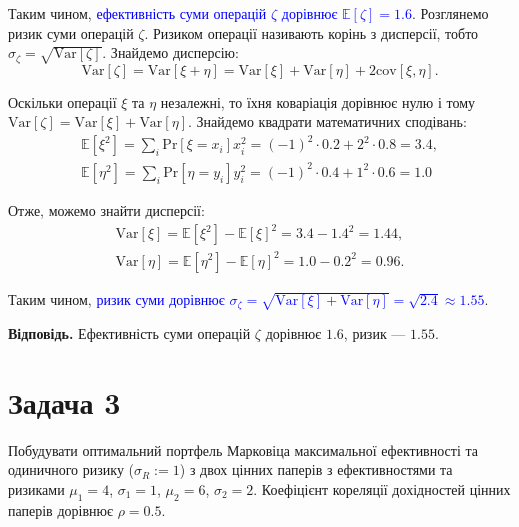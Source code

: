 \documentclass{test_template}
\begin{document}
Таким чином, \textcolor{blue}{ефективність суми операцій $\zeta$ дорівнює
$\mathbb{E}[\zeta] = 1.6$}. Розглянемо ризик суми операцій $\zeta$. Ризиком
операції називають корінь з дисперсії, тобто $\sigma_\zeta =
\sqrt{\text{Var}[\zeta]}$. Знайдемо дисперсію:
\begin{equation*}
    \text{Var}[\zeta] = \text{Var}[\xi + \eta] = \text{Var}[\xi] + \text{Var}[\eta] + 2\text{cov}[\xi,\eta].
\end{equation*}

Оскільки операції $\xi$ та $\eta$ незалежні, то їхня коваріація дорівнює нулю і
тому $\text{Var}[\zeta] = \text{Var}[\xi] + \text{Var}[\eta]$. Знайдемо квадрати 
математичних сподівань:
\begin{gather*}
    \mathbb{E}[\xi^2] = \sum_i \text{Pr}[\xi=x_i]x_i^2 = (-1)^2 \cdot 0.2 + 2^2 \cdot 0.8 = 3.4, \\
    \mathbb{E}[\eta^2] = \sum_i \text{Pr}[\eta=y_i]y_i^2 = (-1)^2 \cdot 0.4 + 1^2 \cdot 0.6 = 1.0
\end{gather*}

Отже, можемо знайти дисперсії:
\begin{gather*}
    \text{Var}[\xi] = \mathbb{E}[\xi^2] - \mathbb{E}[\xi]^2 = 3.4 - 1.4^2 = 1.44, \\
    \text{Var}[\eta] = \mathbb{E}[\eta^2] - \mathbb{E}[\eta]^2 = 1.0 - 0.2^2 = 0.96.
\end{gather*}

Таким чином, \textcolor{blue}{ризик суми дорівнює $\sigma_{\zeta} =
\sqrt{\text{Var}[\xi] + \text{Var}[\eta]} = \sqrt{2.4} \approx 1.55$}.

\textbf{Відповідь.} Ефективність суми операцій $\zeta$ дорівнює $1.6$, ризик ---
$1.55$.

\newpage

\section{Задача 3}

\begin{problem}
    Побудувати оптимальний портфель Марковіца максимальної ефективності та
одиничного ризику ($\sigma_R:=1$) з двох цінних паперів з ефективностями та
ризиками $\mu_1=4$, $\sigma_1=1$, $\mu_2=6$, $\sigma_2=2$. Коефіцієнт кореляції
дохідностей цінних паперів дорівнює $\rho = 0.5$.
\end{problem}
\end{document}
